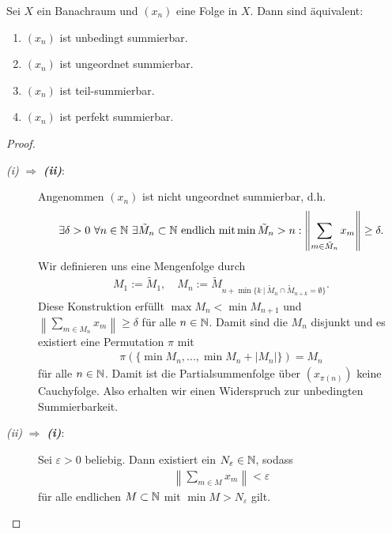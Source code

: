 \begin{sz}\label{th:equi_uncond_1}
	Sei $ X $ ein Banachraum und $ (x_n) $ eine Folge in $ X $.
	Dann sind äquivalent:
	\begin{enumerate}
		\item $  (x_n) $ ist unbedingt summierbar.
		\item $ (x_n) $ ist ungeordnet summierbar.
		\item $ (x_n) $ ist teil-summierbar.
		\item $ (x_n) $ ist perfekt summierbar.
	\end{enumerate}	
	
\end{sz}

\begin{proof}
	\begin{description}
		\item[\textit{ \itshape\textrm{(i)}} $ \Rightarrow $ \textbf{\textit{\textrm{(ii)}}}:]
		Angenommen $ (x_n) $ ist nicht ungeordnet summierbar, d.h.
		\begin{align*}
			\exists \delta > 0 \  
			\forall n \in \mathbb{N} \
			\exists \tilde{M}_n \subset \mathbb{N} \ \textrm{endlich mit}\min \tilde{M}_n > n:
			\left\| \sum_{m \in \tilde{M}_n} x_m \right\| \geq \delta. 
		\end{align*}
		Wir definieren uns eine Mengenfolge durch
		\begin{align*}
			M_1 := \tilde{M}_1, \quad 
			M_n := \tilde{M}_{n + \min\{ k \ | \ \tilde{M}_n \cap \tilde{M}_{n+k} = \emptyset \}}. 
		\end{align*} 
		Diese Konstruktion erfüllt $ \max M_n < \min M_{n+1} $ und $\left\| \sum_{m \in M_n} x_m \right\| \geq \delta $ für alle $ n \in \mathbb{N} $.
		Damit sind die $ M_n $ disjunkt und es existiert eine Permutation $ \pi $ mit
		\begin{align*}
			\pi(\{\min M_n,...,\min M_n + |M_n| \}) = M_n
		\end{align*}
		für alle $ n \in \mathbb{N}  $. Damit ist die Partialsummenfolge über $ (x_{\pi(n)}) $  keine Cauchyfolge.
		Also erhalten wir einen Widerspruch zur unbedingten Summierbarkeit.		
		\item[\textit{ \itshape\textrm{(ii)}} $ \Rightarrow $ \textbf{\textit{\textrm{(i)}}}:]
		Sei $ \varepsilon > 0  $ beliebig. Dann existiert ein $ N_\varepsilon  \in \mathbb{N}$, sodass
		\begin{align*}
			\left\| \sum \limits_{m \in M } x_m \right\| < \varepsilon
		\end{align*}
		für alle endlichen $ M \subset \mathbb{N} $ mit $ \min M > N_\varepsilon $ gilt.

\end{description}
\end{proof}
